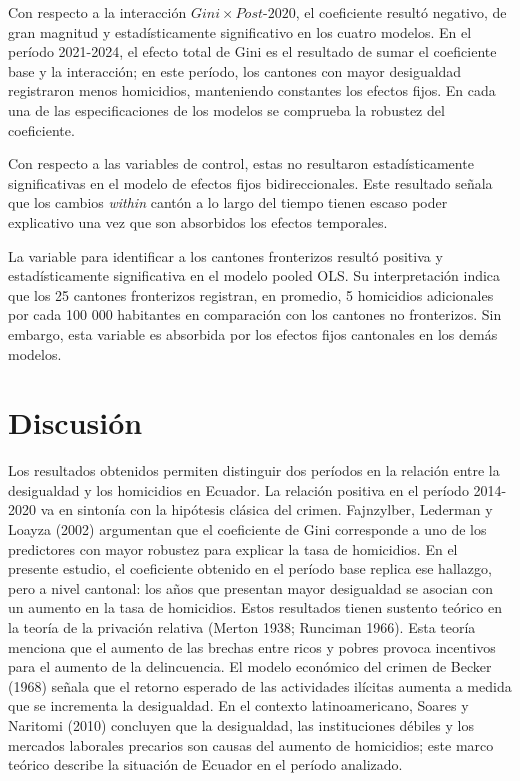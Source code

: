 \documentclass[12pt,a4paper]{article}
\begin{document}
Con respecto a la interacción \(Gini \times Post\text{-}2020\), el coeficiente resultó negativo, de gran magnitud y estadísticamente significativo en los cuatro modelos. En el período 2021-2024, el efecto total de Gini es el resultado de sumar el coeficiente base y la interacción; en este período, los cantones con mayor desigualdad registraron menos homicidios, manteniendo constantes los efectos fijos. En cada una de las especificaciones de los modelos se comprueba la robustez del coeficiente.

Con respecto a las variables de control, estas no resultaron estadísticamente significativas en el modelo de efectos fijos bidireccionales. Este resultado señala que los cambios \textit{within} cantón a lo largo del tiempo tienen escaso poder explicativo una vez que son absorbidos los efectos temporales.

La variable para identificar a los cantones fronterizos resultó positiva y estadísticamente significativa en el modelo pooled OLS. Su interpretación indica que los 25 cantones fronterizos registran, en promedio, 5 homicidios adicionales por cada 100 000 habitantes en comparación con los cantones no fronterizos. Sin embargo, esta variable es absorbida por los efectos fijos cantonales en los demás modelos.

\section*{Discusión}

Los resultados obtenidos permiten distinguir dos períodos en la relación entre la desigualdad y los homicidios en Ecuador. La relación positiva en el período 2014-2020 va en sintonía con la hipótesis clásica del crimen. Fajnzylber, Lederman y Loayza (2002) argumentan que el coeficiente de Gini corresponde a uno de los predictores con mayor robustez para explicar la tasa de homicidios. En el presente estudio, el coeficiente obtenido en el período base replica ese hallazgo, pero a nivel cantonal: los años que presentan mayor desigualdad se asocian con un aumento en la tasa de homicidios. Estos resultados tienen sustento teórico en la teoría de la privación relativa (Merton 1938; Runciman 1966). Esta teoría menciona que el aumento de las brechas entre ricos y pobres provoca incentivos para el aumento de la delincuencia. El modelo económico del crimen de Becker (1968) señala que el retorno esperado de las actividades ilícitas aumenta a medida que se incrementa la desigualdad. En el contexto latinoamericano, Soares y Naritomi (2010) concluyen que la desigualdad, las instituciones débiles y los mercados laborales precarios son causas del aumento de homicidios; este marco teórico describe la situación de Ecuador en el período analizado.
\end{document}
